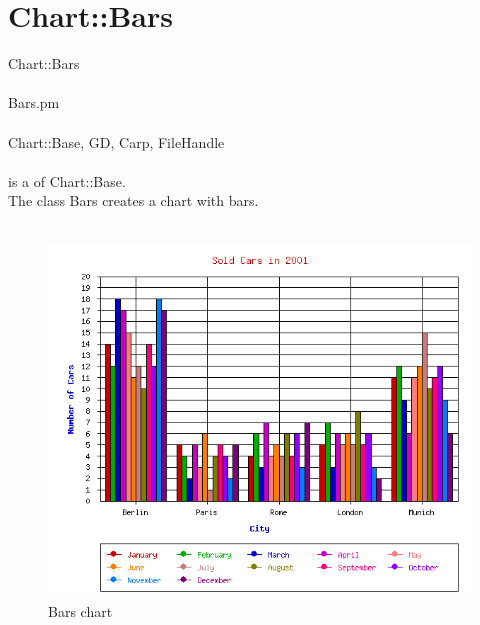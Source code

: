 \section{Chart::Bars}
 Chart::Bars\\ \\
 Bars.pm\\ \\
Chart::Base, GD, Carp, FileHandle\\ \\
  is a  of Chart::Base.\\
The class Bars creates a chart with bars.\\
\\
\begin{figure}[h]
 	\begin{center}
		\includegraphics[scale=0.4]{d_bars.png}
	\end{center}
	\caption{Bars chart}
	\label{fig:bars}
\end{figure}
